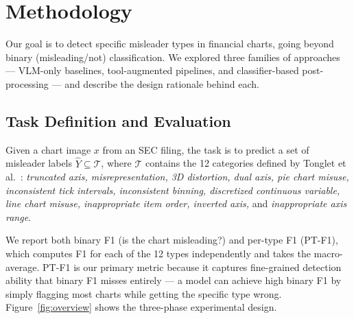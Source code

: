 \section{Methodology}
\label{sec:methodology}

Our goal is to detect specific misleader types in financial charts, going beyond binary (misleading/not) classification. We explored three families of approaches --- VLM-only baselines, tool-augmented pipelines, and classifier-based post-processing --- and describe the design rationale behind each.

\subsection{Task Definition and Evaluation}
\label{sec:formulation}

Given a chart image $x$ from an SEC filing, the task is to predict a set of misleader labels $\hat{Y} \subseteq \mathcal{T}$, where $\mathcal{T}$ contains the 12 categories defined by Tonglet et al.~\cite{tonglet2025misviz}: \textit{truncated axis, misrepresentation, 3D distortion, dual axis, pie chart misuse, inconsistent tick intervals, inconsistent binning, discretized continuous variable, line chart misuse, inappropriate item order, inverted axis,} and \textit{inappropriate axis range}.

We report both binary F1 (is the chart misleading?) and per-type F1 (PT-F1), which computes F1 for each of the 12 types independently and takes the macro-average. PT-F1 is our primary metric because it captures fine-grained detection ability that binary F1 misses entirely --- a model can achieve high binary F1 by simply flagging most charts while getting the specific type wrong. Figure~\ref{fig:overview} shows the three-phase experimental design.

